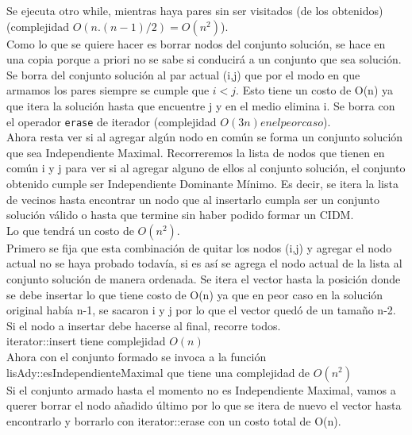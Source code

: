 Se ejecuta otro while, mientras haya pares sin ser visitados (de los obtenidos) (complejidad $O(n.(n-1)/2) = O(n^2)$).\\

Como lo que se quiere hacer es borrar nodos del conjunto soluci\'on, se hace en una copia porque a priori no se sabe si conducir\'a a un conjunto que sea soluci\'on.\\

Se borra del conjunto soluci\'on al par actual (i,j) que por el modo en que armamos los pares siempre se cumple que $i<j$. Esto tiene un costo de O(n) ya que itera la soluci\'on hasta que encuentre j y en el medio elimina i. Se borra con el operador \texttt{erase} de iterador (complejidad $O(3n) en el peor caso$).\\

Ahora resta ver si al agregar alg\'un nodo en com\'un se forma un conjunto soluci\'on que sea Independiente Maximal. Recorreremos la lista de nodos que tienen en com\'un i y j para ver si al agregar alguno de ellos al conjunto soluci\'on, el conjunto obtenido cumple ser Independiente Dominante M\'inimo. Es decir, se itera la lista de vecinos hasta encontrar un nodo que al insertarlo cumpla ser un conjunto soluci\'on v\'alido o hasta que termine sin haber podido formar un CIDM.\\

Lo que tendr\'a un costo de $O(n^2)$.\\

Primero se fija que esta combinaci\'on de quitar los nodos (i,j) y agregar el nodo actual no se haya probado todav\'ia, si es as\'i se agrega el nodo actual de la lista al conjunto soluci\'on de manera ordenada. Se itera el vector hasta la posici\'on donde se debe insertar lo que tiene costo de O(n) ya que en peor caso en la soluci\'on original hab\'ia n-1, se sacaron i y j por lo que el vector qued\'o de un tama\~	no n-2. Si el nodo a insertar debe hacerse al final, recorre todos.\\

iterator::insert tiene complejidad $O(n)$\\

Ahora con el conjunto formado se invoca a la funci\'on lisAdy::esIndependienteMaximal que tiene una complejidad de $O(n^2)$\\

Si el conjunto armado hasta el momento no es Independiente Maximal, vamos a querer borrar el nodo a\~nadido \'ultimo por lo que se itera de nuevo el vector hasta encontrarlo y borrarlo con iterator::erase con un costo total de O(n).\\

